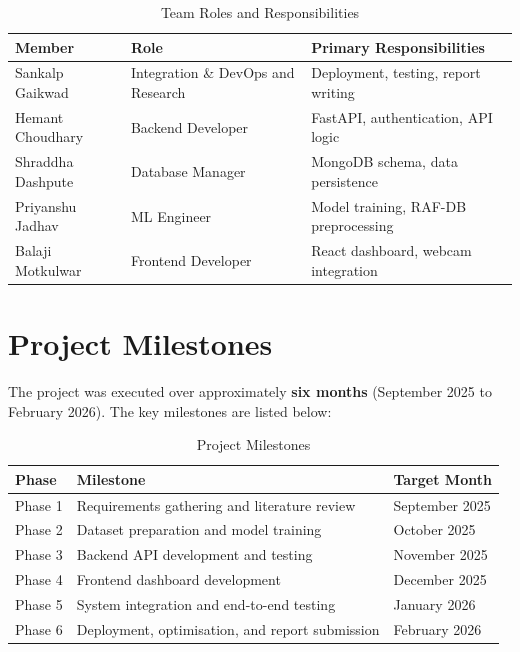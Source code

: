 \begin{table}[H]
\centering
\caption{Team Roles and Responsibilities}
\begin{tabularx}{\textwidth}{lp{4.2cm}X}
\toprule
\textbf{Member}         & \textbf{Role}                  & \textbf{Primary Responsibilities} \\
\midrule
{Sankalp Gaikwad}        & Integration \& DevOps and Research  & Deployment, testing, report writing \\
{Hemant Choudhary}       & Backend Developer              & FastAPI, authentication, API logic \\
{Shraddha Dashpute}      & Database Manager               & MongoDB schema, data persistence \\
{Priyanshu Jadhav}       & ML Engineer                    & Model training, RAF-DB preprocessing \\
{Balaji Motkulwar}       & Frontend Developer             & React dashboard, webcam integration \\
\bottomrule
\end{tabularx}
\end{table}

\section{Project Milestones}

The project was executed over approximately \textbf{six months} (September 2025
to February 2026). The key milestones are listed below:

\begin{table}[H]
\centering
\caption{Project Milestones}
\begin{tabular}{lll}
\toprule
\textbf{Phase} & \textbf{Milestone}                          & \textbf{Target Month} \\
\midrule
Phase 1 & Requirements gathering and literature review       & September 2025 \\
Phase 2 & Dataset preparation and model training             & October 2025   \\
Phase 3 & Backend API development and testing                & November 2025  \\
Phase 4 & Frontend dashboard development                     & December 2025  \\
Phase 5 & System integration and end-to-end testing          & January 2026   \\
Phase 6 & Deployment, optimisation, and report submission    & February 2026  \\
\bottomrule
\end{tabular}
\end{table}

